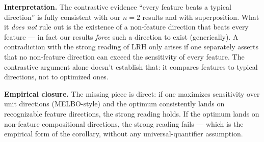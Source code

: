 \documentclass[11pt]{article}
\begin{document}
\medskip
\noindent\textbf{Interpretation.} The contrastive evidence ``every feature beats a typical direction'' is fully consistent with our $n=2$ results and with superposition. What it \emph{does not} rule out is the existence of a non-feature direction that beats every feature --- in fact our results \emph{force} such a direction to exist (generically). A contradiction with the strong reading of LRH only arises if one separately asserts that no non-feature direction can exceed the sensitivity of every feature. The contrastive argument alone doesn't establish that: it compares features to typical directions, not to optimized ones.

\medskip
\noindent\textbf{Empirical closure.} The missing piece is direct: if one maximizes sensitivity over unit directions (MELBO-style) and the optimum consistently lands on recognizable feature directions, the strong reading holds. If the optimum lands on non-feature compositional directions, the strong reading fails --- which is the empirical form of the corollary, without any universal-quantifier assumption.
\end{document}
